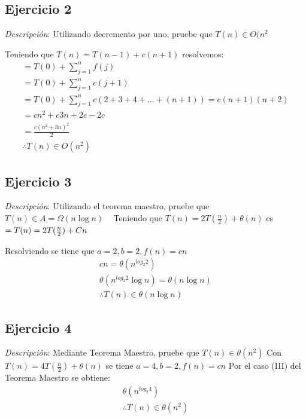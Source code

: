         \newpage
        \subsection{Ejercicio 2}
            \textit{Descripción}: Utilizando decremento por uno, pruebe que \(T(n) \in O(n^{2}\)

            Teniendo que \(T(n) = T(n-1) + c(n+1)\) resolvemos:
                \begin{gather*}
                    = T(0)+\sum_{j=1}^{n}f(j)\\
                    = T(0)+\sum_{j=1}^{n}c(j+1)\\
                    = T(0)+\sum_{j=1}^{n}c(2+3+4+... + (n+1)) = c(n+1)(n+2)\\
                    = cn^{2} + c3n + 2c - 2c \\
                    = \frac{c(n^{2} + 3n)^{2}}{2}\\
                    \therefore T(n)\in O (n^{2})
                \end{gather*}
                
        \subsection{Ejercicio 3}
            \textit{Descripción}: Utilizando el teorema maestro, pruebe que \(T(n) \in A = \Omega(n\log{n})\)
            \
            \newline
            Teniendo que \(T(n) = 2T(\frac{n}{2}) + \theta(n)\) es \(= T(n) = 2T(\frac{n}{2}) + Cn\\\)

            Resolviendo se tiene que \(a=2, b=2, f(n) = cn\)
                \begin{gather*}
                    cn = \theta(n^{log_{2}2})\\
                    \theta(n^{log_{2}2}\log{n}) = \theta(n\log{n}) \\
                    \therefore T(n)\in \theta(n\log{n})
                \end{gather*}

        \subsection{Ejercicio 4}
            \textit{Descripción}: Mediante Teorema Maestro, pruebe que \(T(n) \in \theta(n^{2})\)
            \newline
            Con \(T(n) = 4T(\frac{n}{2}) + \theta(n)\) se tiene \(a=4, b=2, f(n) = cn\)
            \newline
            Por el caso (III) del Teorema Maestro se obtiene: 
                \begin{gather*}
                    \theta(n^{log_{2}4})\\
                    \therefore T(n)\in \theta(n^{2})
                \end{gather*}
        \newpage
